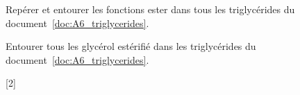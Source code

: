 \numeroQuestion
Repérer et entourer les fonctions ester dans tous les triglycérides du document~\ref{doc:A6_triglycerides}.

\numeroQuestion 
Entourer tous les glycérol estérifié dans les triglycérides du document~\ref{doc:A6_triglycerides}.

[2]